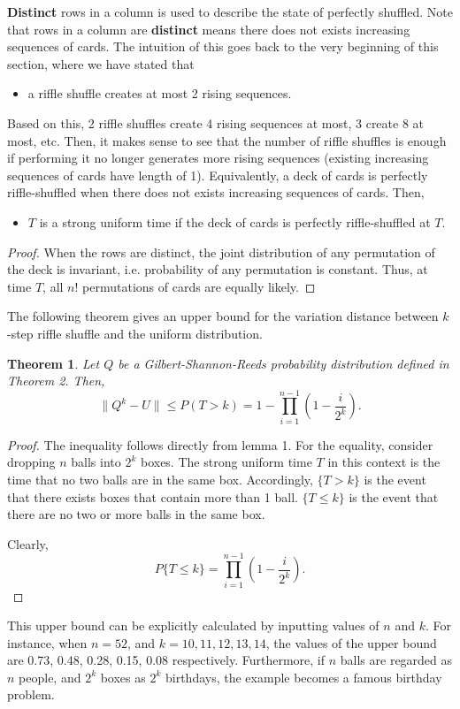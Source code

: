 \documentclass[12pt]{article}
\theoremstyle{plain}
\newtheorem{theorem}{Theorem}
\theoremstyle{definition}
\theoremstyle{remark}
\begin{document}
\textbf{Distinct} rows in a column is used to describe the state of perfectly shuffled. Note that rows in a column are \textbf{distinct} means there does not exists increasing sequences of cards. The intuition of this goes back to the very beginning of this section, where we have stated that 
\begin{itemize}
    \item a riffle shuffle creates at most 2 rising sequences.
\end{itemize}
Based on this, 2 riffle shuffles create 4 rising sequences at most, 3 create 8 at most, etc. Then, it makes sense to see that the number of riffle shuffles is enough if performing it no longer generates more rising sequences (existing increasing sequences of cards have length of 1). Equivalently, a deck of cards is perfectly riffle-shuffled when there does not exists increasing sequences of cards. Then,
\begin{itemize}
    \item $T$ is a strong uniform time if the deck of cards is perfectly riffle-shuffled at $T$.
\end{itemize}

\begin{proof}
When the rows are distinct, the joint distribution of any permutation of the deck is invariant, i.e. probability of any permutation is constant. Thus, at time $T$, all $n!$ permutations of cards are equally likely.
\end{proof}

The following theorem gives an upper bound for the variation distance between $k$-step riffle shuffle and the uniform distribution.

\begin{theorem}\cite[Theorem~5 on \pno~344]{1.1}
Let $Q$ be a Gilbert-Shannon-Reeds probability distribution defined in Theorem 2. Then,
\[   \big\|Q^k-U\big\| \leq P(T > k) = 1 - \prod_{i=1}^{n-1}(1-\frac{i}{2^k}).  \]
\end{theorem}

\begin{proof}
The inequality follows directly from lemma 1. For the equality, consider dropping $n$ balls into $2^k$ boxes. The strong uniform time $T$ in this context is the time that no two balls are in the same box.  Accordingly, $\{T>k\}$ is the event that there exists boxes that contain more than 1 ball. $\{T\leq k\}$ is the event that there are no two or more balls in the same box. 

Clearly, $$P\{T\leq k\}=\prod_{i=1}^{n-1}(1-\frac{i}{2^k}).$$
\end{proof}
This upper bound can be explicitly calculated by inputting values of $n$ and $k$. For instance\cite[344]{1.1}, when $n=52$, and $k=10, 11, 12, 13, 14$, the values of the upper bound are 0.73, 0.48, 0.28, 0.15, 0.08 respectively. Furthermore, if $n$ balls are regarded as $n$ people, and $2^k$ boxes as $2^k$ birthdays, the example becomes a famous birthday problem.
\end{document}
